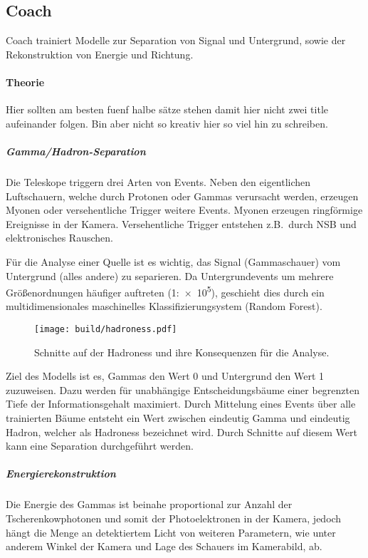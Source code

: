 \subsection{Coach}%
\label{sub:coach}

Coach trainiert Modelle zur Separation von Signal und Untergrund,
sowie der Rekonstruktion von Energie und Richtung.

\paragraph{Theorie}%
{\color{red}Hier sollten am besten fuenf halbe sätze stehen damit hier nicht zwei title aufeinander
folgen. Bin aber nicht so kreativ hier so viel hin zu schreiben.}

\subparagraph{Gamma/Hadron-Separation}
Die Teleskope triggern drei Arten von Events.
Neben den eigentlichen Luftschauern,
welche durch Protonen
oder Gammas verursacht werden,
erzeugen Myonen oder versehentliche Trigger weitere Events.
Myonen erzeugen ringförmige Ereignisse in der Kamera.
Versehentliche Trigger entstehen z.B.\ durch NSB und elektronisches Rauschen.

Für die Analyse einer Quelle ist es wichtig,
das Signal (Gammaschauer) vom
Untergrund (alles andere) zu separieren.
Da Untergrundevents um mehrere Größenordnungen häufiger auftreten (1:\num{e5}),
geschieht dies durch ein multidimensionales maschinelles
Klassifizierungsystem (Random Forest).

\begin{wrapfigure}[18]{L}{0.6\textwidth}
  \centering
  \texttt{[image: build/hadroness.pdf]}
  \caption{Schnitte auf der Hadroness und ihre Konsequenzen für die Analyse.}%
  \label{fig:uebersicht}
\end{wrapfigure}

Ziel des Modells ist es, Gammas den Wert 0 und Untergrund den Wert 1 zuzuweisen.
Dazu werden für unabhängige Entscheidungsbäume einer begrenzten Tiefe
der Informationsgehalt maximiert.
Durch Mittelung eines Events über alle trainierten Bäume entsteht ein Wert
zwischen eindeutig Gamma und eindeutig Hadron, welcher als Hadroness bezeichnet
wird.
Durch Schnitte auf diesem Wert kann eine Separation durchgeführt werden.

\subparagraph{Energierekonstruktion}%
\label{par:energie}

Die Energie des Gammas ist beinahe proportional
zur Anzahl der Tscherenkowphotonen
und somit der Photoelektronen in der Kamera,
jedoch hängt die Menge an detektiertem Licht von weiteren Parametern,
wie unter anderem Winkel der Kamera und Lage des Schauers im Kamerabild, ab.

